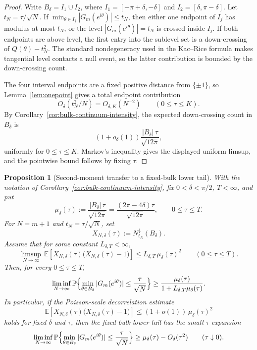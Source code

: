\documentclass[11pt]{amsart}
\numberwithin{equation}{section}
\newtheorem{proposition}[theorem]{Proposition}
\theoremstyle{definition}
\theoremstyle{remark}
\newcommand{\Prob}{\mathbb P}
\newcommand{\Exp}{\mathbb E}
\begin{document}
\begin{proof}
Write \(B_\delta=I_1\cup I_2\), where
\(I_1=[-\pi+\delta,-\delta]\) and \(I_2=[\delta,\pi-\delta]\).  Let
\(t_N=\tau/\sqrt N\).  If
\(\min_{\theta\in I_j}|G_m(e^{i\theta})|\le t_N\), then either one endpoint of
\(I_j\) has modulus at most \(t_N\), or the level
\(|G_m(e^{i\theta})|=t_N\) is crossed inside \(I_j\).  If both endpoints are
above level, the first entry into the sublevel set is a down-crossing of
\(Q(\theta)-t_N^2\).  The standard nondegeneracy used in the Kac--Rice formula
makes tangential level contacts a null event, so the latter contribution is
bounded by the down-crossing count.

The four interval endpoints are a fixed positive distance from \(\{\pm1\}\),
so Lemma~\ref{lem:onepoint} gives a total endpoint contribution
\[
  O_\delta(t_N^2/N)=O_{\delta,K}(N^{-2})
  \qquad(0\le\tau\le K).
\]
By Corollary~\ref{cor:bulk-continuum-intensity}, the expected down-crossing
count in \(B_\delta\) is
\[
  \left(1+o_\delta(1)\right)
  \frac{|B_\delta|\,\tau}{\sqrt{12\pi}},
\]
uniformly for \(0\le\tau\le K\).  Markov's inequality gives the displayed
uniform limsup, and the pointwise bound follows by fixing \(\tau\).
\end{proof}

\begin{proposition}[Second-moment transfer to a fixed-bulk lower tail]
\label{prop:bulk-secondmoment-transfer}
With the notation of Corollary~\ref{cor:bulk-continuum-intensity}, fix
\(0<\delta<\pi/2\), \(T<\infty\), and put
\[
  \mu_\delta(\tau):=\frac{|B_\delta|\,\tau}{\sqrt{12\pi}}
  =\frac{(2\pi-4\delta)\tau}{\sqrt{12\pi}},
  \qquad 0\le\tau\le T.
\]
For \(N=m+1\) and \(t_N=\tau/\sqrt N\), set
\[
  X_{N,\delta}(\tau):=N_{t_N}^\downarrow(B_\delta).
\]
Assume that for some constant \(L_{\delta,T}<\infty\),
\begin{equation}\label{eq:bulk-factorial-secondmoment}
  \limsup_{N\to\infty}\,
  \Exp\!\left[
    X_{N,\delta}(\tau)\bigl(X_{N,\delta}(\tau)-1\bigr)
  \right]
  \le L_{\delta,T}\,\mu_\delta(\tau)^2
  \qquad(0\le\tau\le T).
\end{equation}
Then, for every \(0\le\tau\le T\),
\begin{equation}\label{eq:bulk-lower-transfer}
  \liminf_{N\to\infty}
  \Prob\Bigl\{
    \min_{\theta\in B_\delta}|G_m(e^{i\theta})|
    \le \frac{\tau}{\sqrt N}
  \Bigr\}
  \ge
  \frac{\mu_\delta(\tau)}
       {1+L_{\delta,T}\mu_\delta(\tau)}.
\end{equation}
In particular, if the Poisson-scale decorrelation estimate
\[
  \Exp\!\left[
    X_{N,\delta}(\tau)\bigl(X_{N,\delta}(\tau)-1\bigr)
  \right]
  \le (1+o(1))\,\mu_\delta(\tau)^2
\]
holds for fixed \(\delta\) and \(\tau\), then the fixed-bulk lower tail has the
small-\(\tau\) expansion
\[
  \liminf_{N\to\infty}
  \Prob\Bigl\{
    \min_{\theta\in B_\delta}|G_m(e^{i\theta})|
    \le \frac{\tau}{\sqrt N}
  \Bigr\}
  \ge
  \mu_\delta(\tau)-O_\delta(\tau^2)
  \qquad(\tau\downarrow0).
\]
\end{proposition}
\end{document}
